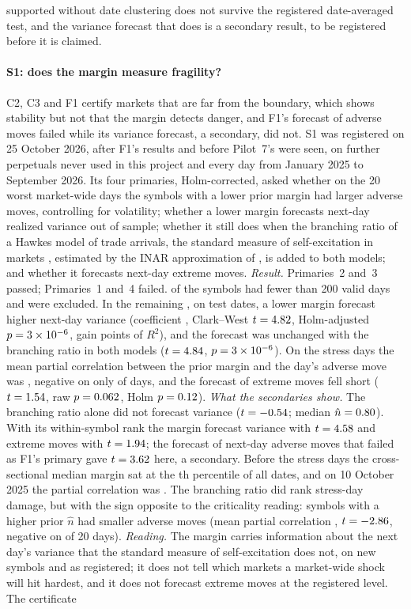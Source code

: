 supported without date clustering does not survive the registered date-averaged test, and the variance forecast that does is a secondary result, to be registered before it is claimed.

\paragraph{S1: does the margin measure fragility?} C2, C3 and F1 certify markets that are far from the boundary, which shows stability but not that the margin detects danger, and F1's forecast of adverse moves failed while its variance forecast, a secondary, did not. S1 was registered on 25 October 2026, after F1's results and before Pilot~7's were seen, on \SoneDrawn{} further perpetuals never used in this project and every day from January 2025 to September 2026. Its four primaries, Holm-corrected, asked whether on the 20 worst market-wide days the symbols with a lower prior margin had larger adverse moves, controlling for volatility; whether a lower margin forecasts next-day realized variance out of sample; whether it still does when the branching ratio of a Hawkes model of trade arrivals, the standard measure of self-excitation in markets \citep{t:filimonov2012,t:hardiman2013}, estimated by the INAR approximation of \citet{t:kirchner2016}, is added to both models; and whether it forecasts next-day extreme moves. \emph{Result.} Primaries~2 and~3 passed; Primaries~1 and~4 failed. \SoneExcluded{} of the \SoneDrawn{} symbols had fewer than 200 valid days and were excluded. In the remaining \SoneSymbols{}, on \SoneDates{} test dates, a lower margin forecast higher next-day variance (coefficient \SoneRvCoef{}, Clark--West $t=4.82$, Holm-adjusted $p=3\times10^{-6}$, gain \SoneRvGain{} points of $R^2$), and the forecast was unchanged with the branching ratio in both models ($t=4.84$, $p=3\times10^{-6}$). On the stress days the mean partial correlation between the prior margin and the day's adverse move was \SoneRho{}, negative on only \SoneRhoNeg{} of \SoneStress{} days, and the forecast of extreme moves fell short ($t=1.54$, raw $p=0.062$, Holm $p=0.12$). \emph{What the secondaries show.} The branching ratio alone did not forecast variance ($t=-0.54$; median $\hat n=0.80$). With its within-symbol rank the margin forecast variance with $t=4.58$ and extreme moves with $t=1.94$; the forecast of next-day adverse moves that failed as F1's primary gave $t=3.62$ here, a secondary. Before the stress days the cross-sectional median margin sat at the \SoneMarginPct{}th percentile of all dates, and on 10 October 2025 the partial correlation was \SoneOctRho{}. The branching ratio did rank stress-day damage, but with the sign opposite to the criticality reading: symbols with a higher prior $\hat n$ had smaller adverse moves (mean partial correlation \SoneNhatStressRho{}, $t=-2.86$, negative on \SoneNhatStressNeg{} of 20 days). \emph{Reading.} The margin carries information about the next day's variance that the standard measure of self-excitation does not, on new symbols and as registered; it does not tell which markets a market-wide shock will hit hardest, and it does not forecast extreme moves at the registered level. The certificate 